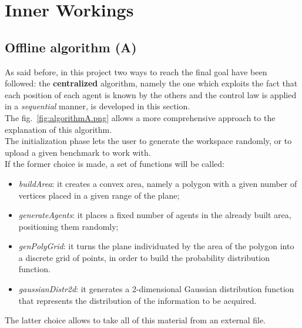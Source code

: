\documentclass[a4paper,11pt,oneside]{book}
\begin{document}
	
	
	
	\section{Inner Workings}
	\subsection{Offline algorithm (A)}
	
	As said before, in this project two ways to reach the final goal have been followed: the \textbf{centralized} algorithm, namely the one which exploits the fact that each position of each agent is known by the others and the control law is applied in a \textit{sequential} manner, is developed in this section.\\
The fig.~\ref{fig:algorithmA.png} allows a more comprehensive approach to the explanation of this algorithm.\\
The initialization phase lets the user to generate the workspace randomly, or to upload a given benchmark to work with. \\
If the former choice is made, a set of functions will be called:
 \begin{itemize}
		\item \textit{buildArea}: it creates a convex area, namely a polygon with a given number of vertices placed in a given range of the plane;
		\item \textit{generateAgents}: it places a fixed number of agents in the already built area, positioning them randomly;
		\item \textit{genPolyGrid}: it turns the plane individuated by the area of the polygon into a discrete grid of points, in order to build the probability distribution function.  
		\item \textit{gaussianDistr2d}: it generates a 2-dimensional Gaussian distribution function that represents the distribution of the information to be acquired. 
\end {itemize}
The latter choice allows to take all of this material from an external file.\\
\end{document}
